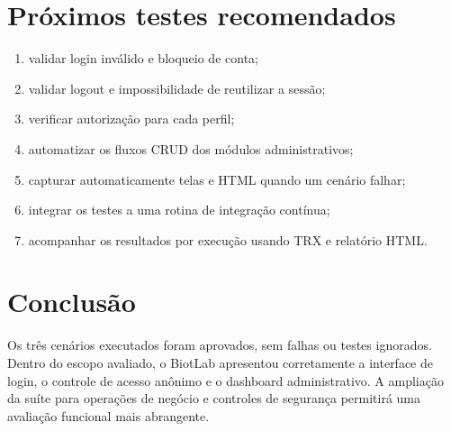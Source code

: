 \documentclass[12pt,a4paper]{article}
\begin{document}
\section{Próximos testes recomendados}

\begin{enumerate}[label=\arabic*.]
  \item validar login inválido e bloqueio de conta;
  \item validar logout e impossibilidade de reutilizar a sessão;
  \item verificar autorização para cada perfil;
  \item automatizar os fluxos CRUD dos módulos administrativos;
  \item capturar automaticamente telas e HTML quando um cenário falhar;
  \item integrar os testes a uma rotina de integração contínua;
  \item acompanhar os resultados por execução usando TRX e relatório HTML.
\end{enumerate}

\section{Conclusão}

Os três cenários executados foram aprovados, sem falhas ou testes ignorados.
Dentro do escopo avaliado, o BiotLab apresentou corretamente a interface de
login, o controle de acesso anônimo e o dashboard administrativo. A ampliação
da suíte para operações de negócio e controles de segurança permitirá uma
avaliação funcional mais abrangente.
\end{document}
